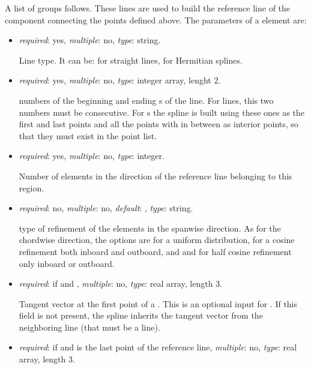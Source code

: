 %
A list of  groups follows. These lines are used to build the reference line of the component connecting the points defined above. The parameters of a  element are:
\begin{itemize}

\item {} \textit{required}: yes, \textit{multiple}: no, \textit{type}: string.

    Line type. It can be:  for straight lines,  for Hermitian splines.

\item {}  \textit{required}: yes, \textit{multiple}: no, \textit{type}: integer array, lenght 2.

     numbers of the beginning and ending s of the line. For  lines, this two numbers must be consecutive. For s the spline is built using these ones as the first and last points and all the points with  in between as interior points, so that they must exist in the point list.

\item {}  \textit{required}: yes, \textit{multiple}: no, \textit{type}: integer.

    Number of elements in the direction of the reference line belonging to this region.

\item {} \textit{required}: no, \textit{multiple}: no, \textit{default}: , \textit{type}: string.

    type of refinement of the elements in the spanwise direction. As for the chordwise direction, the options are  for a uniform distribution,  for a cosine refinement both inboard and outboard, and  and  for half cosine refinement only inboard or outboard. 
  
\item {} \textit{required}: if  and , \textit{multiple}: no, \textit{type}: real array, length 3. 

    Tangent vector at the first point of a . This is an optional input for . If this field is not present, the spline inherits the tangent vector from the neighboring line (that must be a  line).

\item {} \textit{required}: if  and  is the last point of the reference line, \textit{multiple}: no, \textit{type}: real array, length 3. 


\end{itemize}
